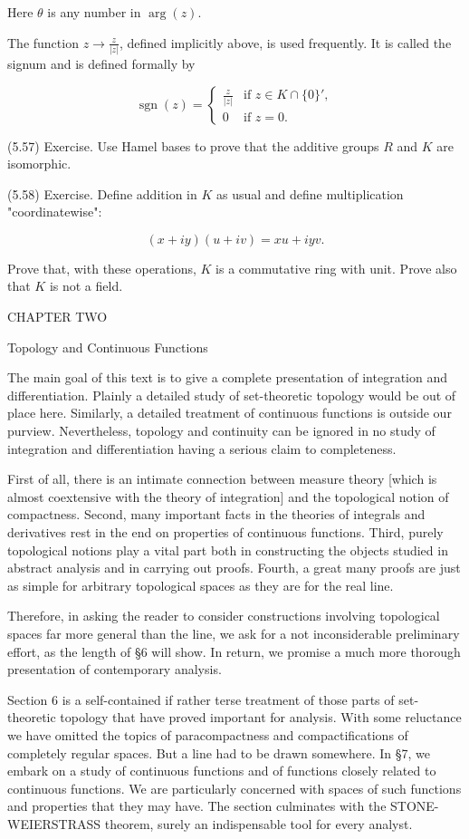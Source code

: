 Here $\theta$ is any number in $\arg(z)$.

The function $z \to \frac{z}{|z|}$, defined implicitly above, is used frequently. It is called the signum and is defined formally by

$$\operatorname{sgn}(z) = \begin{cases} \frac{z}{|z|} & \text{if } z \in K \cap \{0\}', \\ 0 & \text{if } z = 0. \end{cases}$$

(5.57) Exercise. Use Hamel bases to prove that the additive groups $R$ and $K$ are isomorphic.

(5.58) Exercise. Define addition in $K$ as usual and define multiplication "coordinatewise":

$$(x + iy) (u + iv) = xu + iyv.$$

Prove that, with these operations, $K$ is a commutative ring with unit. Prove also that $K$ is not a field.

CHAPTER TWO

Topology and Continuous Functions

The main goal of this text is to give a complete presentation of integration and differentiation. Plainly a detailed study of set-theoretic topology would be out of place here. Similarly, a detailed treatment of continuous functions is outside our purview. Nevertheless, topology and continuity can be ignored in no study of integration and differentiation having a serious claim to completeness.

First of all, there is an intimate connection between measure theory [which is almost coextensive with the theory of integration] and the topological notion of compactness. Second, many important facts in the theories of integrals and derivatives rest in the end on properties of continuous functions. Third, purely topological notions play a vital part both in constructing the objects studied in abstract analysis and in carrying out proofs. Fourth, a great many proofs are just as simple for arbitrary topological spaces as they are for the real line.

Therefore, in asking the reader to consider constructions involving topological spaces far more general than the line, we ask for a not inconsiderable preliminary effort, as the length of §6 will show. In return, we promise a much more thorough presentation of contemporary analysis.

Section 6 is a self-contained if rather terse treatment of those parts of set-theoretic topology that have proved important for analysis. With some reluctance we have omitted the topics of paracompactness and compactifications of completely regular spaces. But a line had to be drawn somewhere. In §7, we embark on a study of continuous functions and of functions closely related to continuous functions. We are particularly concerned with spaces of such functions and properties that they may have. The section culminates with the STONE-WEIERSTRASS theorem, surely an indispensable tool for every analyst.

